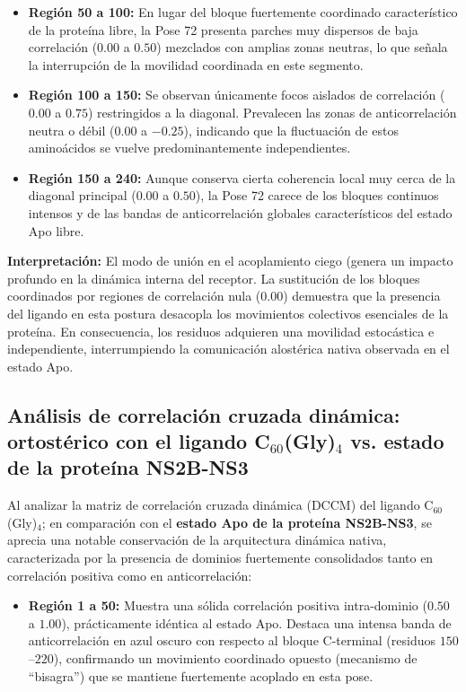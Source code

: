 \begin{table}[htbp]
\begin{itemize}
    \item \textbf{Región 50 a 100:} En lugar del bloque fuertemente coordinado característico de la proteína libre, la Pose 72 presenta parches muy dispersos de baja correlación ($0.00$ a $0.50$) mezclados con amplias zonas neutras, lo que señala la interrupción de la movilidad coordinada en este segmento.
    
    \item \textbf{Región 100 a 150:} Se observan únicamente focos aislados de correlación ($0.00$ a $0.75$) restringidos a la diagonal. Prevalecen las zonas de anticorrelación neutra o débil ($0.00$ a $-0.25$), indicando que la fluctuación de estos aminoácidos se vuelve predominantemente independientes.
    
    \item \textbf{Región 150 a 240:} Aunque conserva cierta coherencia local muy cerca de la diagonal principal ($0.00$ a $0.50$), la Pose 72 carece de los bloques continuos intensos y de las bandas de anticorrelación globales característicos del estado Apo libre.
\end{itemize}

\textbf{Interpretación:} El modo de unión en el acoplamiento ciego (genera un impacto profundo en la dinámica interna del receptor. La sustitución de los bloques coordinados por regiones de correlación nula ($0.00$) demuestra que la presencia del ligando en esta postura desacopla los movimientos colectivos esenciales de la proteína. En consecuencia, los residuos adquieren una movilidad estocástica e independiente, interrumpiendo la comunicación alostérica nativa observada en el estado Apo.

\subsection*{Análisis de correlación cruzada dinámica: ortostérico con el ligando C$_{60}$(Gly)$_{4}$  vs. estado de la proteína NS2B-NS3}

Al analizar la matriz de correlación cruzada dinámica (DCCM) del ligando C$_{60}$(Gly)$_{4}$;  en comparación con el \textbf{estado Apo de la proteína NS2B-NS3}, se aprecia una notable conservación de la arquitectura dinámica nativa, caracterizada por la presencia de dominios fuertemente consolidados tanto en correlación positiva  como en anticorrelación:

\begin{itemize}
    \item \textbf{Región 1 a 50:} Muestra una sólida correlación positiva intra-dominio ($0.50$ a $1.00$), prácticamente idéntica al estado Apo. Destaca una intensa banda de anticorrelación en azul oscuro  con respecto al bloque C-terminal (residuos $150$--$220$), confirmando un movimiento coordinado opuesto (mecanismo de ``bisagra'') que se mantiene fuertemente acoplado en esta pose.
    

\end{itemize}
\end{table}
